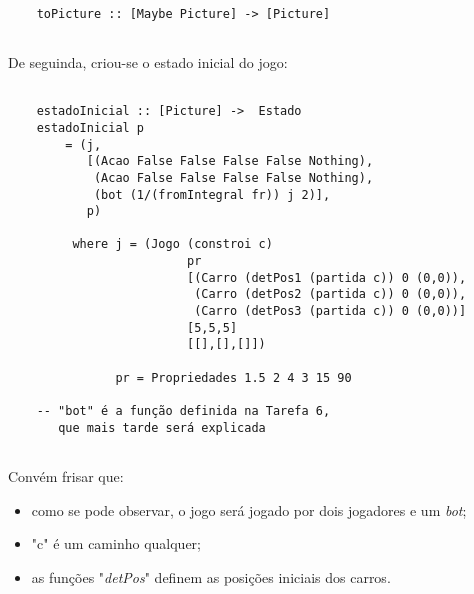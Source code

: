 \documentclass[a4paper]{report} %
\begin{document}
  \begin{verbatim}
      
    toPicture :: [Maybe Picture] -> [Picture]
      
  \end{verbatim}
  
  \newpage
  
  \par \noindent De seguinda, criou-se o estado inicial do jogo:
  
  \begin{verbatim}
      
    estadoInicial :: [Picture] ->  Estado
    estadoInicial p 
        = (j,
           [(Acao False False False False Nothing),
            (Acao False False False False Nothing),
            (bot (1/(fromIntegral fr)) j 2)],
           p)
           
         where j = (Jogo (constroi c) 
                         pr 
                         [(Carro (detPos1 (partida c)) 0 (0,0)),
                          (Carro (detPos2 (partida c)) 0 (0,0)),
                          (Carro (detPos3 (partida c)) 0 (0,0))] 
                         [5,5,5] 
                         [[],[],[]])
                         
               pr = Propriedades 1.5 2 4 3 15 90
                         
    -- "bot" é a função definida na Tarefa 6, 
       que mais tarde será explicada
                         
  \end{verbatim}
  
  \par \noindent Convém frisar que:
  
  \begin{itemize}
  
      \item como se pode observar, o jogo será jogado por dois jogadores e um \textit{bot};
      
      \item "c" é um caminho qualquer;
      
      \item as funções "\textit{detPos}" definem as posições iniciais dos carros.
      
  \end{itemize}
  
  \par \noindent 
  
  \newpage 
  
\end{document}
